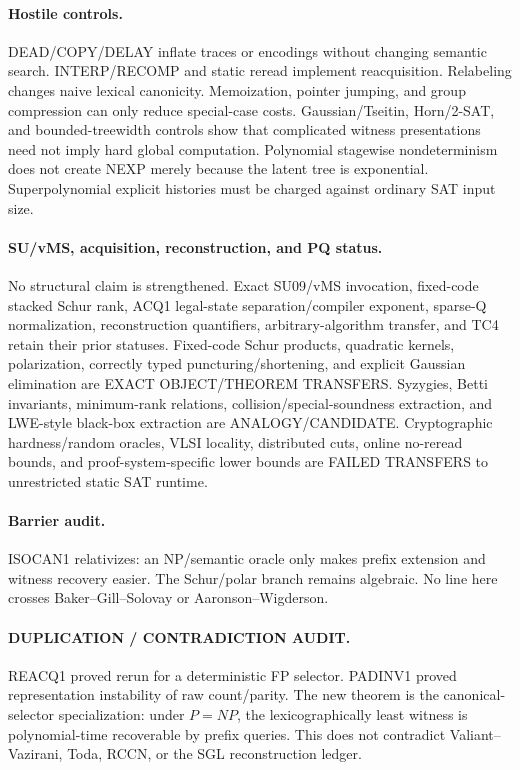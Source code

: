 \documentclass[11pt]{article}
\begin{document}
\paragraph{Hostile controls.} DEAD/COPY/DELAY inflate traces or encodings without changing semantic search. INTERP/RECOMP and static reread implement reacquisition. Relabeling changes naive lexical canonicity. Memoization, pointer jumping, and group compression can only reduce special-case costs. Gaussian/Tseitin, Horn/2-SAT, and bounded-treewidth controls show that complicated witness presentations need not imply hard global computation. Polynomial stagewise nondeterminism does not create NEXP merely because the latent tree is exponential. Superpolynomial explicit histories must be charged against ordinary SAT input size.

\paragraph{SU/vMS, acquisition, reconstruction, and PQ status.} No structural claim is strengthened. Exact SU09/vMS invocation, fixed-code stacked Schur rank, ACQ1 legal-state separation/compiler exponent, sparse-Q normalization, reconstruction quantifiers, arbitrary-algorithm transfer, and TC4 retain their prior statuses. Fixed-code Schur products, quadratic kernels, polarization, correctly typed puncturing/shortening, and explicit Gaussian elimination are EXACT OBJECT/THEOREM TRANSFERS. Syzygies, Betti invariants, minimum-rank relations, collision/special-soundness extraction, and LWE-style black-box extraction are ANALOGY/CANDIDATE. Cryptographic hardness/random oracles, VLSI locality, distributed cuts, online no-reread bounds, and proof-system-specific lower bounds are FAILED TRANSFERS to unrestricted static SAT runtime.

\paragraph{Barrier audit.} ISOCAN1 relativizes: an NP/semantic oracle only makes prefix extension and witness recovery easier. The Schur/polar branch remains algebraic. No line here crosses Baker--Gill--Solovay or Aaronson--Wigderson.

\paragraph{DUPLICATION / CONTRADICTION AUDIT.} REACQ1 proved rerun for a deterministic FP selector. PADINV1 proved representation instability of raw count/parity. The new theorem is the canonical-selector specialization: under $P=NP$, the lexicographically least witness is polynomial-time recoverable by prefix queries. This does not contradict Valiant--Vazirani, Toda, RCCN, or the SGL reconstruction ledger.
\end{document}
